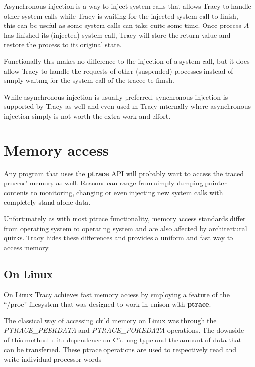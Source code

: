 \documentclass[a4paper, 10pt]{report}
\begin{document}
Asynchronous injection is a way to inject system calls that allows Tracy to
handle other system calls while Tracy is waiting for the injected system call
to finish, this can be useful as some system calls can take quite some time.
Once process $A$ has finished its (injected) system call, Tracy will store
the return value and restore the process to its original state.

Functionally this makes no difference to the injection of a system call, but
it does allow Tracy to handle the requests of other (suspended) processes
instead of simply waiting for the system call of the tracee to finish.

While asynchronous injection is usually preferred, synchronous injection is
supported by Tracy as well and even used in Tracy internally where
asynchronous injection simply is not worth the extra work and effort.

\section{Memory access}


Any program that uses the \textbf{ptrace} API will probably want to access the
traced process' memory as well. Reasons can range from simply dumping pointer
contents to monitoring, changing or even injecting new system calls with
completely stand-alone data.


Unfortunately as with most ptrace functionality, memory access standards
differ from operating system to operating system and are also
affected by architectural quirks. Tracy hides these differences and
provides a uniform and fast way to access memory.

\subsection{On Linux}
On Linux Tracy achieves fast memory access by employing a feature of the
``/proc'' filesystem that was designed to work in unison with
\textbf{ptrace}.

The classical way of accessing child memory on Linux was through the
\textit{PTRACE\_PEEKDATA} and \textit{PTRACE\_POKEDATA} operations.
The downside of this method is its dependence on C's long type and the
amount of data that can be transferred.
These ptrace operations are used to respectively read and write individual
processor words.
\end{document}
